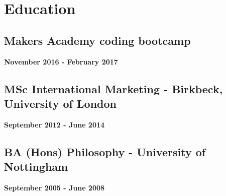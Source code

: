 \documentclass[a4paper]{scrartcl}
\begin{document}
\section*{Education}

\subsection*{Makers Academy coding bootcamp}
\textbf{November 2016 - February 2017}

\subsection*{MSc International Marketing - Birkbeck, University of London}
\textbf{September 2012 - June 2014}

\subsection*{BA (Hons) Philosophy - University of Nottingham}
\textbf{September 2005 - June 2008}
\end{document}
